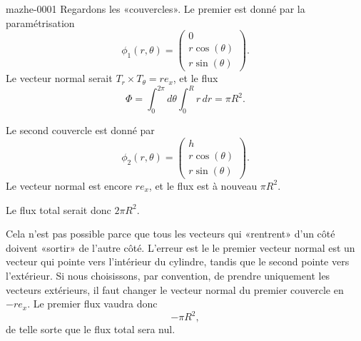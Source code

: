 \begin{corrige}{mazhe-0001}
    Regardons les «couvercles». Le premier est donné par la paramétrisation
    \begin{equation}
        \phi_1(r,\theta)=\begin{pmatrix}
            0    \\ 
            r\cos(\theta)    \\ 
            r\sin(\theta)    
        \end{pmatrix}.
    \end{equation}
    Le vecteur normal serait $T_r\times T_{\theta}=re_x$, et le flux
    \begin{equation}
        \Phi=\int_0^{2\pi}d\theta\int_0^Rr\,dr=\pi R^2.
    \end{equation}
    
    Le second couvercle est donné par
    \begin{equation}
        \phi_2(r,\theta)=\begin{pmatrix}
            h    \\ 
            r\cos(\theta)    \\ 
            r\sin(\theta)    
        \end{pmatrix}.
    \end{equation}
    Le vecteur normal est encore $re_x$, et le flux est à nouveau $\pi R^2$.

    Le flux total serait donc $2\pi R^2$.

    Cela n'est pas possible parce que tous les vecteurs qui «rentrent» d'un côté doivent «sortir» de l'autre côté. L'erreur est le le premier vecteur normal est un vecteur qui pointe vers l'intérieur du cylindre, tandis que le second pointe vers l'extérieur. Si nous choisissons, par convention, de prendre uniquement les vecteurs extérieurs, il faut changer le vecteur normal du premier couvercle en $-re_x$. Le premier flux vaudra donc
    \begin{equation}
        -\pi R^2,
    \end{equation}
    de telle sorte que le flux total sera nul.

\end{corrige}
